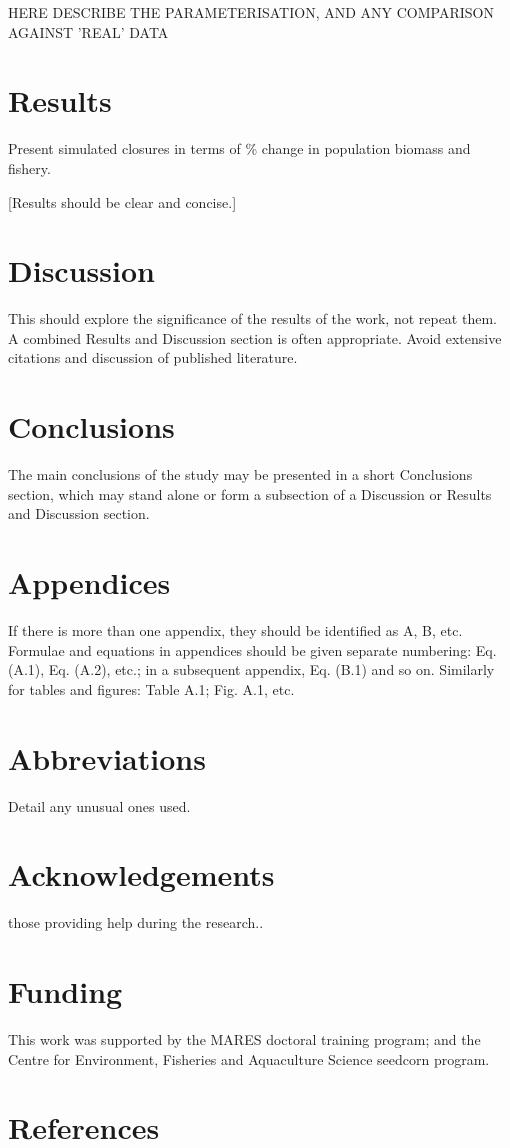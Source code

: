 \documentclass[review]{elsarticle}
\begin{document}
HERE DESCRIBE THE PARAMETERISATION, AND ANY COMPARISON AGAINST 'REAL' DATA

\section{Results}

Present simulated closures in terms of \% change in population biomass and
fishery.

[Results should be clear and concise.]

\section{Discussion}

This should explore the significance of the results of the work, not repeat
them. A combined Results
and Discussion section is often appropriate. Avoid extensive citations and
discussion of published
literature.

\section{Conclusions}

The main conclusions of the study may be presented in a short Conclusions
section, which may stand
alone or form a subsection of a Discussion or Results and Discussion section.

\section*{Appendices}

If there is more than one appendix, they should be identified as A, B, etc.
Formulae and equations in appendices should be given separate numbering: Eq.
(A.1), Eq. (A.2), etc.; in a subsequent appendix, Eq. (B.1) and so on.
Similarly for tables and figures: Table A.1; Fig. A.1, etc.

\section*{Abbreviations} Detail any unusual ones used.

\section*{Acknowledgements} those providing help during the research..

\section*{Funding} This work was supported by the MARES doctoral training
program; and the Centre for Environment, Fisheries and Aquaculture Science
seedcorn program.




\section*{References}


\end{document}
